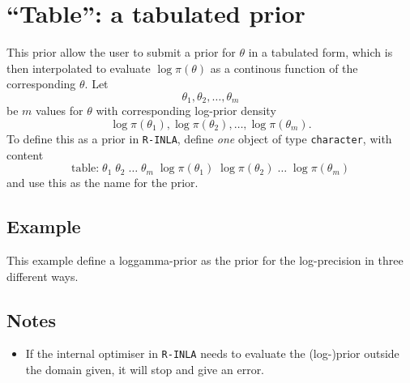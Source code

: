 \documentclass[a4paper,11pt]{article}
\begin{document}
\section*{``Table'': a tabulated prior}

This prior allow the user to submit a prior for $\theta$ in a
tabulated form, which is then interpolated to evaluate
$\log\pi(\theta)$ as a continous function of the corresponding
$\theta$.  Let
\begin{displaymath}
    \theta_{1}, \theta_{2}, \ldots, \theta_{m}
\end{displaymath}
be $m$ values for $\theta$ with corresponding log-prior density
\begin{displaymath}
    \log\pi(\theta_{1}),
    \log\pi(\theta_{2}), \ldots,
    \log\pi(\theta_{m}).
\end{displaymath}
To define this as a prior in \verb|R-INLA|, define \emph{one} object
of type \verb|character|, with content
\begin{displaymath}
    \text{table:}\;
    \theta_{1} \; \theta_{2}\;  \ldots \; \theta_{m} \;
    \log\pi(\theta_{1}) \;
    \log\pi(\theta_{2}) \; \ldots \;
    \log\pi(\theta_{m})
\end{displaymath}
and use this as the name for the prior. 

\subsection*{Example}
This example define a loggamma-prior as the prior for the
log-precision in three different ways.



\subsection*{Notes}
\begin{itemize}
\item If the internal optimiser in \verb|R-INLA| needs to evaluate the
    (log-)prior outside the domain given, it will stop and give an error.
\end{itemize}
\end{document}

